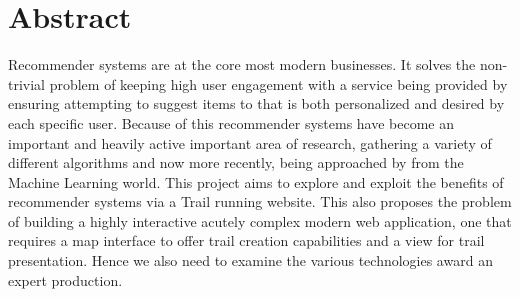 \chapter*{Abstract}
Recommender systems are at the core most modern businesses. It solves the non-trivial problem of keeping high user engagement with a service being provided by ensuring attempting to suggest items to that is both personalized and desired by each specific user. Because of this recommender systems have become an important and heavily active important area of research, gathering a variety of different algorithms and now more recently, being approached by from the Machine Learning world. This project aims to explore and exploit the benefits of recommender systems via a Trail running website. This also proposes the problem of building a highly interactive acutely complex modern web application, one that requires a map interface to offer trail creation capabilities and a view for trail presentation. Hence we also need to examine the various technologies award an expert production.